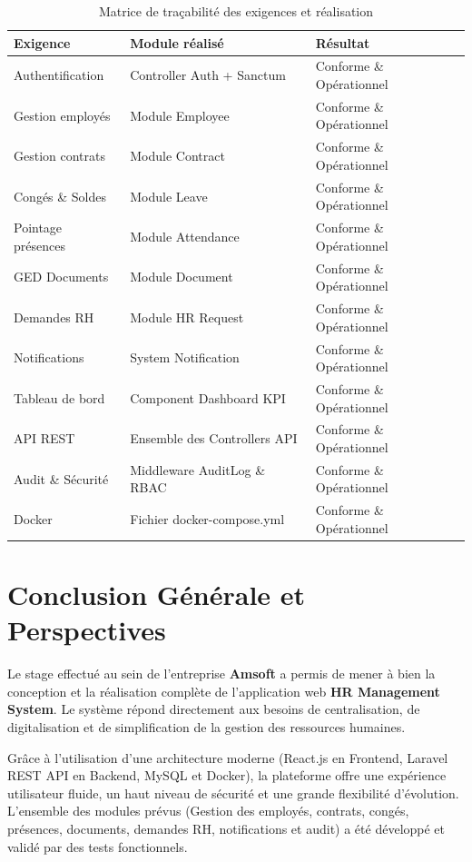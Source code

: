 \documentclass[12pt,a4paper]{report}
\begin{document}
\begin{table}[H]
\centering
\caption{Matrice de traçabilité des exigences et réalisation}
\label{tab:tracabilite}
\begin{tabularx}{\textwidth}{l X X}
\toprule
\textbf{Exigence} & \textbf{Module réalisé} & \textbf{Résultat} \\
\midrule
Authentification & Controller Auth + Sanctum & Conforme \& Opérationnel \\
Gestion employés & Module Employee & Conforme \& Opérationnel \\
Gestion contrats & Module Contract & Conforme \& Opérationnel \\
Congés \& Soldes & Module Leave & Conforme \& Opérationnel \\
Pointage présences & Module Attendance & Conforme \& Opérationnel \\
GED Documents & Module Document & Conforme \& Opérationnel \\
Demandes RH & Module HR Request & Conforme \& Opérationnel \\
Notifications & System Notification & Conforme \& Opérationnel \\
Tableau de bord & Component Dashboard KPI & Conforme \& Opérationnel \\
API REST & Ensemble des Controllers API & Conforme \& Opérationnel \\
Audit \& Sécurité & Middleware AuditLog \& RBAC & Conforme \& Opérationnel \\
Docker & Fichier docker-compose.yml & Conforme \& Opérationnel \\
\bottomrule
\end{tabularx}
\end{table}

\chapter*{Conclusion Générale et Perspectives}

Le stage effectué au sein de l'entreprise \textbf{Amsoft} a permis de mener à bien la conception et la réalisation complète de l'application web \textbf{HR Management System}. Le système répond directement aux besoins de centralisation, de digitalisation et de simplification de la gestion des ressources humaines.

Grâce à l'utilisation d'une architecture moderne (React.js en Frontend, Laravel REST API en Backend, MySQL et Docker), la plateforme offre une expérience utilisateur fluide, un haut niveau de sécurité et une grande flexibilité d'évolution. L'ensemble des modules prévus (Gestion des employés, contrats, congés, présences, documents, demandes RH, notifications et audit) a été développé et validé par des tests fonctionnels.
\end{document}
